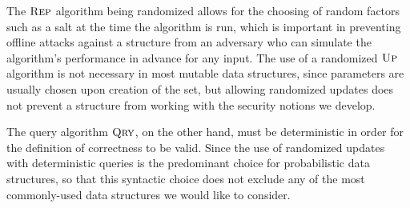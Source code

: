 
 

The $\textsc{Rep}$ algorithm being randomized allows for the choosing of random factors such as a salt at the time the algorithm is run, which is important in preventing offline attacks against a structure from an adversary who can simulate the algorithm's performance in advance for any input. The use of a randomized $\textsc{Up}$ algorithm is not necessary in most mutable data structures, since parameters are usually chosen upon creation of the set, but allowing randomized updates does not prevent a structure from working with the security notions we develop.

The query algorithm $\textsc{Qry}$, on the other hand, must be deterministic in order for the definition of correctness to be valid. Since the use of randomized updates with deterministic queries is the predominant choice for probabilistic data structures, so that this syntactic choice does not exclude any of the most commonly-used data structures we would like to consider.